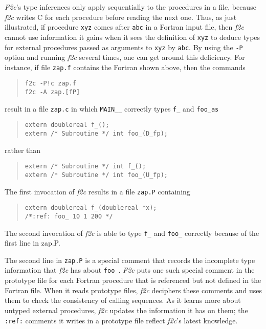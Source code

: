 \documentclass[12pt]{article}
\begin{document}
\emph{F2c}’s type inferences only apply sequentially to the procedures in a file, because \emph{f2c} writes C for each procedure before reading the next one. Thus, as just illustrated, if procedure \verb|xyz| comes after \verb|abc| in a Fortran input file, then \emph{f2c} cannot use information it gains when it sees the definition of \verb|xyz| to deduce types for external procedures passed as arguments to \verb|xyz| by \verb|abc|. By using the \verb|-P| option and running \emph{f2c} several times, one can get around this deficiency. For instance, if file \verb|zap.f| contains the Fortran shown above, then the commands
\begin{quote}
\begin{verbatim}
f2c -P!c zap.f
f2c -A zap.[fP]
\end{verbatim}
\end{quote}
result in a file \verb|zap.c| in which \verb|MAIN__| correctly types \verb|f_| and \verb|foo_as|
\begin{quote}
\begin{verbatim}
extern doublereal f_();
extern /* Subroutine */ int foo_(D_fp);
\end{verbatim}
\end{quote}
rather than
\begin{quote}
\begin{verbatim}
extern /* Subroutine */ int f_();
extern /* Subroutine */ int foo_(U_fp);
\end{verbatim}
\end{quote}
The first invocation of \emph{f2c} results in a file \verb|zap.P| containing
\begin{quote}
\begin{verbatim}
extern doublereal f_(doublereal *x);
/*:ref: foo_ 10 1 200 */
\end{verbatim}
\end{quote}
The second invocation of \emph{f2c} is able to type \verb|f_| and \verb|foo_| correctly because of the first line in zap.P.

The second line in \verb|zap.P| is a special comment that records the incomplete type information that \emph{f2c} has about \verb|foo_|. \emph{F2c} puts one such special comment in the prototype file for each Fortran procedure that is referenced but not defined in the Fortran file. When it reads prototype files, \emph{f2c} deciphers these comments and uses them to check the consistency of calling sequences. As it learns more about untyped external procedures, \emph{f2c} updates the information it has on them; the \verb|:ref:| comments it writes in a prototype file reflect \emph{f2c}’s latest knowledge.
\end{document}
